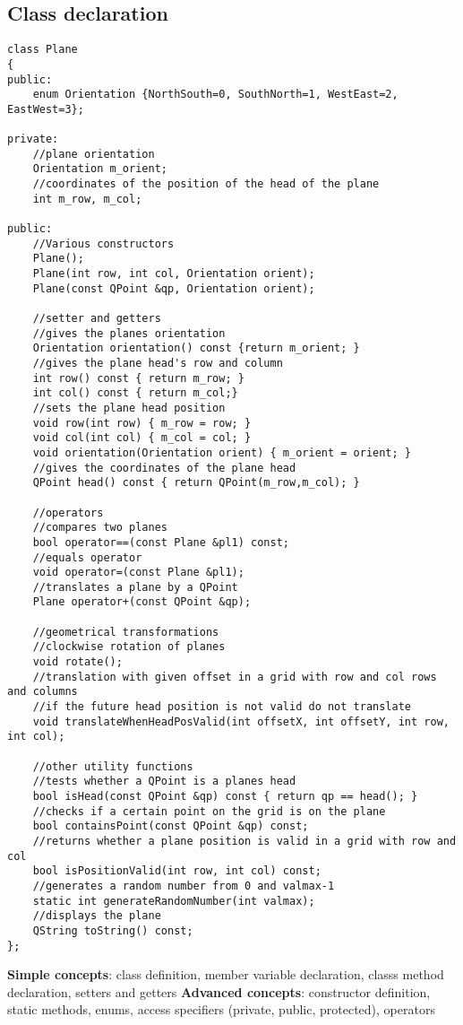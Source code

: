 \documentclass{article}
\begin{document}
\subsection{Class declaration}
\begin{lstlisting}
class Plane
{
public:
    enum Orientation {NorthSouth=0, SouthNorth=1, WestEast=2, EastWest=3};

private:
    //plane orientation
    Orientation m_orient;
    //coordinates of the position of the head of the plane
    int m_row, m_col;

public:
    //Various constructors
    Plane();
    Plane(int row, int col, Orientation orient);
    Plane(const QPoint &qp, Orientation orient);

    //setter and getters
    //gives the planes orientation
    Orientation orientation() const {return m_orient; }
    //gives the plane head's row and column
    int row() const { return m_row; }
    int col() const { return m_col;}
    //sets the plane head position
    void row(int row) { m_row = row; }
    void col(int col) { m_col = col; }
    void orientation(Orientation orient) { m_orient = orient; }
    //gives the coordinates of the plane head
    QPoint head() const { return QPoint(m_row,m_col); }

    //operators
    //compares two planes
    bool operator==(const Plane &pl1) const;
    //equals operator
    void operator=(const Plane &pl1);
    //translates a plane by a QPoint
    Plane operator+(const QPoint &qp);

    //geometrical transformations
    //clockwise rotation of planes
    void rotate();
    //translation with given offset in a grid with row and col rows and columns
    //if the future head position is not valid do not translate
    void translateWhenHeadPosValid(int offsetX, int offsetY, int row, int col);

    //other utility functions
    //tests whether a QPoint is a planes head
    bool isHead(const QPoint &qp) const { return qp == head(); }
    //checks if a certain point on the grid is on the plane
    bool containsPoint(const QPoint &qp) const;
    //returns whether a plane position is valid in a grid with row and col
    bool isPositionValid(int row, int col) const;
    //generates a random number from 0 and valmax-1
    static int generateRandomNumber(int valmax);
    //displays the plane
    QString toString() const;
};
\end{lstlisting}
\textbf{Simple concepts}: class definition, member variable declaration, classs method declaration, setters and getters\newline
\textbf{Advanced concepts}: constructor definition, static methods, enums, access specifiers (private, public, protected), operators\newline
\end{document}
